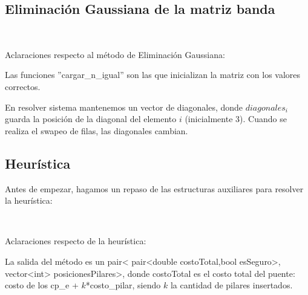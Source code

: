 \subsection{Eliminación Gaussiana de la matriz banda}

{\tiny



}

~

{\normalsize
Aclaraciones respecto al método de Eliminación Gaussiana:

Las funciones ''cargar\_n\_igual'' son las que inicializan la matriz con los valores correctos.

En resolver sistema mantenemos un vector de diagonales, donde $diagonales_{i}$
guarda la posición de la diagonal del elemento $i$ (inicialmente 3). Cuando se realiza el swapeo de filas, las diagonales
cambian.
}

\subsection{Heurística}

Antes de empezar, hagamos un repaso de las estructuras auxiliares para resolver la heurística:

{\tiny



}

{\tiny



}

~

Aclaraciones respecto de la heurística:

La salida del método es un pair< pair<double costoTotal,bool esSeguro>, vector<int> posicionesPilares>, donde
costoTotal es el costo total del puente: costo de los cp\_e + $k$*costo\_pilar, siendo $k$ la cantidad de pilares insertados.

